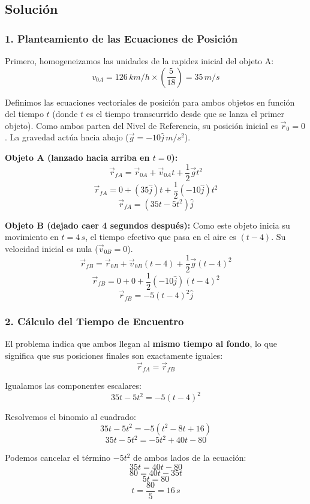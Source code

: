 \documentclass[12pt, a4paper]{article}
\begin{document}
\subsection*{Solución}

\subsubsection*{1. Planteamiento de las Ecuaciones de Posición}
Primero, homogeneizamos las unidades de la rapidez inicial del objeto A:
$$ v_{0A} = 126 \, \si{km/h} \times \left( \frac{5}{18} \right) = 35 \, \si{m/s} $$

Definimos las ecuaciones vectoriales de posición para ambos objetos en función del tiempo $t$ (donde $t$ es el tiempo transcurrido desde que se lanza el primer objeto). Como ambos parten del Nivel de Referencia, su posición inicial es $\vec{r}_0 = 0$. La gravedad actúa hacia abajo ($\vec{g} = -10\hat{j} \, \si{m/s^2}$).

\textbf{Objeto A (lanzado hacia arriba en $t=0$):}
$$ \vec{r}_{fA} = \vec{r}_{0A} + \vec{v}_{0A} t + \frac{1}{2} \vec{g} t^2 $$
$$ \vec{r}_{fA} = 0 + (35\hat{j})t + \frac{1}{2}(-10\hat{j})t^2 $$
$$ \vec{r}_{fA} = (35t - 5t^2)\hat{j} $$

\textbf{Objeto B (dejado caer 4 segundos después):}
Como este objeto inicia su movimiento en $t = 4 \, \si{s}$, el tiempo efectivo que pasa en el aire es $(t - 4)$. Su velocidad inicial es nula ($\vec{v}_{0B} = 0$).
$$ \vec{r}_{fB} = \vec{r}_{0B} + \vec{v}_{0B}(t - 4) + \frac{1}{2}\vec{g}(t - 4)^2 $$
$$ \vec{r}_{fB} = 0 + 0 + \frac{1}{2}(-10\hat{j})(t - 4)^2 $$
$$ \vec{r}_{fB} = -5(t - 4)^2\hat{j} $$

\subsubsection*{2. Cálculo del Tiempo de Encuentro}
El problema indica que ambos llegan al \textbf{mismo tiempo al fondo}, lo que significa que sus posiciones finales son exactamente iguales:
$$ \vec{r}_{fA} = \vec{r}_{fB} $$

Igualamos las componentes escalares:
$$ 35t - 5t^2 = -5(t - 4)^2 $$

Resolvemos el binomio al cuadrado:
$$ 35t - 5t^2 = -5(t^2 - 8t + 16) $$
$$ 35t - 5t^2 = -5t^2 + 40t - 80 $$

Podemos cancelar el término $-5t^2$ de ambos lados de la ecuación:
$$ 35t = 40t - 80 $$
$$ 80 = 40t - 35t $$
$$ 5t = 80 $$
$$ t = \frac{80}{5} = 16 \, \si{s} $$
\end{document}
